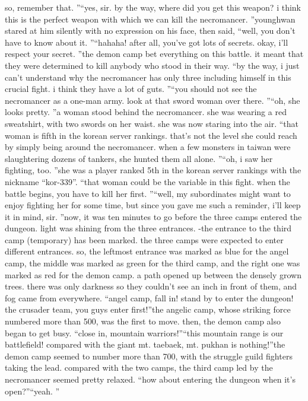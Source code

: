  so, remember that.
”“yes, sir.
 by the way, where did you get this weapon? i think this is the perfect weapon with which we can kill the necromancer.
”younghwan stared at him silently with no expression on his face, then said, “well, you don’t have to know about it.
”“hahaha! after all, you’ve got lots of secrets.
 okay, i’ll respect your secret.
”the demon camp bet everything on this battle.
 it meant that they were determined to kill anybody who stood in their way.
“by the way, i just can’t understand why the necromancer has only three including himself in this crucial fight.
 i think they have a lot of guts.
”“you should not see the necromancer as a one-man army.
 look at that sword woman over there.
”“oh, she looks pretty.
”a woman stood behind the necromancer.
 she was wearing a red sweatshirt, with two swords on her waist.
 she was now staring into the air.
“that woman is fifth in the korean server rankings.
 that’s not the level she could reach by simply being around the necromancer.
 when a few monsters in taiwan were slaughtering dozens of tankers, she hunted them all alone.
”“oh, i saw her fighting, too.
”she was a player ranked 5th in the korean server rankings with the nickname “kor-339”.
“that woman could be the variable in this fight.
 when the battle begins, you have to kill her first.
”“well, my subordinates might want to enjoy fighting her for some time, but since you gave me such a reminder, i’ll keep it in mind, sir.
”now, it was ten minutes to go before the three camps entered the dungeon.
light was shining from the three entrances.
-the entrance to the third camp (temporary) has been marked.
the three camps were expected to enter different entrances.
 so, the leftmost entrance was marked as blue for the angel camp, the middle was marked as green for the third camp, and the right one was marked as red for the demon camp.
a path opened up between the densely grown trees.
there was only darkness so they couldn’t see an inch in front of them, and fog came from everywhere.
“angel camp, fall in! stand by to enter the dungeon! the crusader team, you guys enter first!”the angelic camp, whose striking force numbered more than 500, was the first to move.
then, the demon camp also began to get busy.
“close in, mountain warriors!”“this mountain range is our battlefield! compared with the giant mt.
 taebaek, mt.
 pukhan is nothing!”the demon camp seemed to number more than 700, with the struggle guild fighters taking the lead.
compared with the two camps, the third camp led by the necromancer seemed pretty relaxed.
“how about entering the dungeon when it’s open?”“yeah.
”

